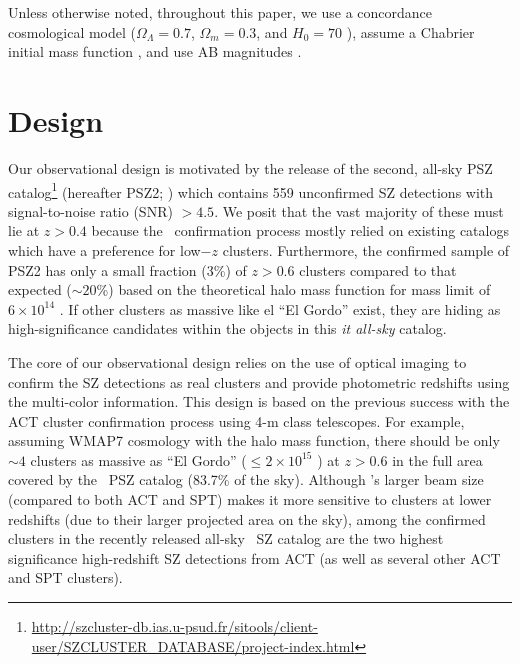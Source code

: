 \documentclass[apj, revtex4-1]{emulateapj}
\begin{document}
Unless otherwise noted, throughout this paper, we use a concordance cosmological model ($\Omega_\Lambda = 0.7$, $\Omega_m = 0.3$, and $H_0= 70$ \kms \permpc), assume a Chabrier initial mass function \citep{Chabrier2003}, and use AB magnitudes \citep{Oke1974}.

\section{Design}\label{sec:design}
Our observational design is motivated by the release of the second, all-sky PSZ catalog\footnote{\url{http://szcluster-db.ias.u-psud.fr/sitools/client-user/SZCLUSTER_DATABASE/project-index.html}} (hereafter PSZ2; \citealt{PlanckCollaboration2015a}) which contains 559 unconfirmed SZ detections with signal-to-noise ratio (SNR) $> 4.5$. We posit that the vast majority of these must lie at $z>0.4$ because the \planck\ confirmation process \citep{PlanckCollaboration2014} mostly relied on existing catalogs which have a preference for low$-z$ clusters. Furthermore, the confirmed sample of PSZ2 has only a small fraction (3\%) of $z > 0.6$ clusters compared to that expected ($\sim20$\%) based on the theoretical halo mass function  for mass limit of $6\times10^{14}$ \msol. If other clusters as massive like el ``El Gordo'' exist, they are hiding as high-significance candidates within the objects in this \textit{it all-sky} catalog.

The core of our observational design relies on the use of optical imaging to confirm the SZ detections as real clusters and provide photometric redshifts using the multi-color information. This design is based on the previous success with the ACT cluster confirmation process using 4-m class telescopes.
%
For example, assuming WMAP7 cosmology \citep{Komatsu2011} with the \cite{Tinker2008} halo mass function, there should be only $\sim4$ clusters as massive as ``El Gordo'' ($\leq 2 \times 10^{15}$ \Msol) at $z > 0.6$ in the full area covered by the \planck\ PSZ catalog (83.7\% of the sky). Although \planck’s larger beam size (compared to both ACT and SPT) makes it more sensitive to clusters at lower redshifts (due to their larger projected area on the sky), among the confirmed clusters in the recently released all-sky \planck\ SZ catalog are the two highest significance high-redshift SZ detections from ACT (as well as several other ACT and SPT clusters).
\end{document}

